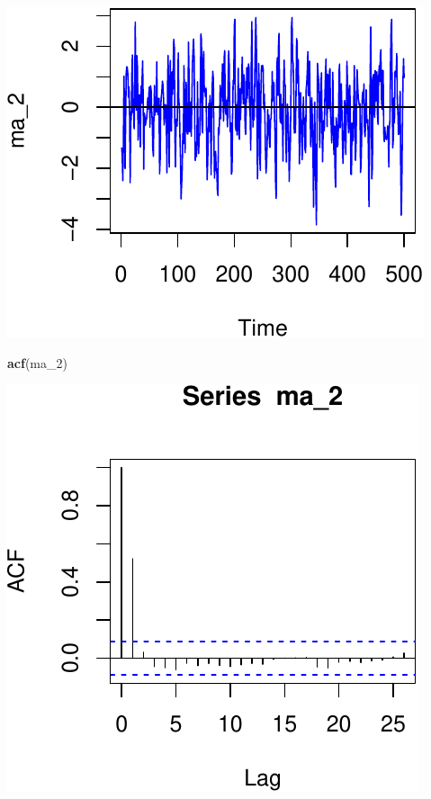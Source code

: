 \documentclass[11pt,]{article}
\newenvironment{Shaded}{\begin{snugshade}}{\end{snugshade}}
\newcommand{\KeywordTok}[1]{\textcolor[rgb]{0.13,0.29,0.53}{\textbf{#1}}}
\newcommand{\DecValTok}[1]{\textcolor[rgb]{0.00,0.00,0.81}{#1}}
\newcommand{\NormalTok}[1]{#1}
\begin{document}
\begin{center}\includegraphics{FMC_T4_PhD_ARMA_GARCH_files/figure-latex/MA-4} \end{center}

\begin{Shaded}
\begin{Highlighting}[]
\KeywordTok{acf}\NormalTok{(ma_}\DecValTok{2}\NormalTok{)}
\end{Highlighting}
\end{Shaded}

\begin{center}\includegraphics{FMC_T4_PhD_ARMA_GARCH_files/figure-latex/MA-5} \end{center}
\end{document}
